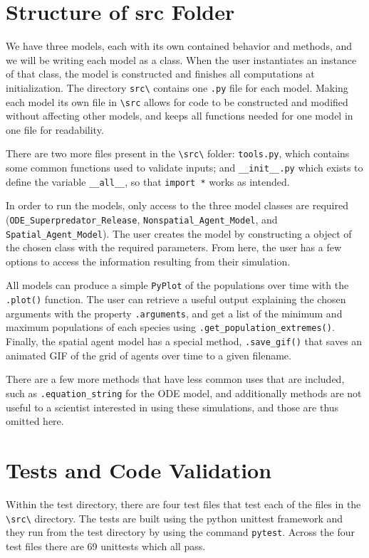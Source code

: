 \documentclass[journal]{IEEEtran}
\begin{document}
\section{Structure of src Folder}
We have three models, each with its own contained behavior and methods, and we will be writing each model as a class. When the user instantiates an instance of that class, the model is constructed and finishes all computations at initialization. The directory \verb|src\| contains one \verb|.py| file for each model. Making each model its own file in \verb|\src| allows for code to be constructed and modified without affecting other models, and keeps all functions needed for one model in one file for readability.\par
There are two more files present in the \verb|\src\| folder: \verb|tools.py|, which contains some common functions used to validate inputs; and \verb|__init__.py| which exists to define the variable \verb|__all__|, so that \verb|import *| works as intended.\par
In order to run the models, only access to the three model classes are required (\verb|ODE_Superpredator_Release|, \verb|Nonspatial_Agent_Model|, and \verb|Spatial_Agent_Model|). The user creates the model by constructing a object of the chosen class with the required parameters. From here, the user has a few options to access the information resulting from their simulation.\par
All models can produce a simple \verb|PyPlot| of the populations over time with the \verb|.plot()| function. The user can retrieve a useful output explaining the chosen arguments with the property \verb|.arguments|, and get a list of the minimum and maximum populations of each species using \verb|.get_population_extremes()|. Finally, the spatial agent model has a special method, \verb|.save_gif()| that saves an animated GIF of the grid of agents over time to a given filename.\par
There are a few more methods that have less common uses that are included, such as \verb|.equation_string| for the ODE model, and additionally methods are not useful to a scientist interested in using these simulations, and those are thus omitted here.

\section{Tests and Code Validation}
Within the test directory, there are four test files that test each of the files in the \verb|\src\| directory. The tests are built using the python unittest framework and they run from the test directory by using the command \verb|pytest|. Across the four test files there are 69 unittests which all pass.
\end{document}
